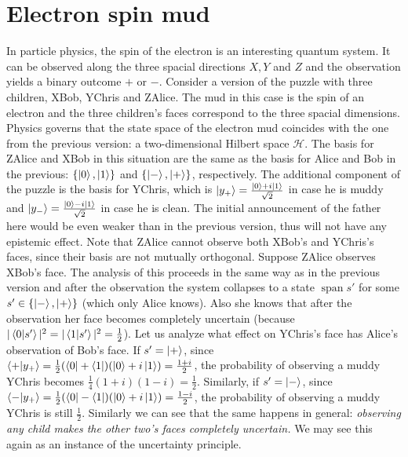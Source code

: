 \documentclass[a4paper]{article}
\newcommand{\HH}{\mathcal{H}}
\DeclareMathOperator{\spn}{span}
\begin{document}
\section*{Electron spin mud}
In particle physics, the spin of the electron is an interesting quantum system.
It can be observed along the three spacial directions $X, Y$ and $Z$ and the
observation yields a binary outcome $+$ or $-$. Consider a version of the puzzle
with three children, XBob, YChris and ZAlice. The mud in this case is the spin
of an electron and the three children's faces correspond to the three spacial
dimensions. Physics governs that the state space of the electron mud coincides
with the one from the previous version: a two-dimensional Hilbert space $\HH$.
The basis for ZAlice and XBob in this situation are the same as the basis for
Alice and Bob in the previous: $\{\ket{0},\ket{1}\}$ and $\{\ket{-},\ket{+}\}$,
respectively. The additional component of the puzzle is the basis for YChris,
which is $\ket{y_+} = \frac{\ket{0}+i\ket{1}}{\sqrt{2}}$ in case he is muddy and
$\ket{y_-} = \frac{\ket{0}-i\ket{1}}{\sqrt{2}}$ in case he is clean. The initial
announcement of the father here would be even weaker than in the previous
version, thus will not have any epistemic effect. Note that ZAlice cannot
observe both XBob's and YChris's faces, since their basis are not mutually
orthogonal. Suppose ZAlice observes XBob's face. The analysis of this proceeds
in the same way as in the previous version and after the observation the system
collapses to a state $\spn s'$ for some $s' \in \{\ket{-},\ket{+}\}$ (which only
Alice knows). Also she knows that after the observation her face becomes
completely uncertain (because $|\braket{0|s'}|^2 = |\braket{1|s'}|^2 =
\frac{1}{2}$). Let us analyze what effect on YChris's face has Alice's
observation of Bob's face. If $s' = \ket{+}$, since 
$\braket{+|y_+} = \frac{1}{2}(\bra{0} + \bra{1})(\ket{0} + i\ket{1}) =
\frac{1+i}{2}$, the probability of observing a muddy YChris becomes
$\frac{1}{4}(1+i)(1-i) = \frac{1}{2}$. Similarly, if $s' = \ket{-}$, since
$\braket{-|y_+} = \frac{1}{2}(\bra{0} - \bra{1})(\ket{0} + i\ket{1}) =
\frac{1-i}{2}$, the probability of observing a muddy YChris is still
$\frac{1}{2}$. Similarly we can see that the same happens in general:
\emph{observing any child makes the other two's faces completely uncertain.}
We may see this again as an instance of the uncertainty principle.
\end{document}
